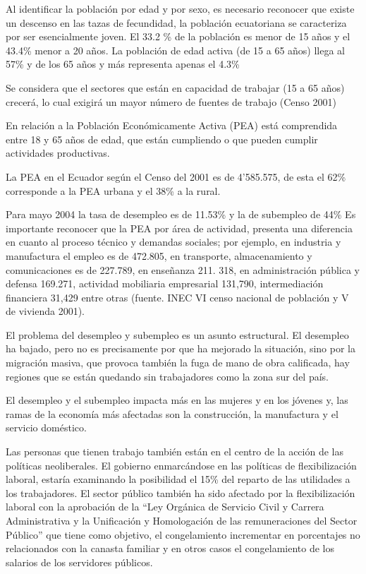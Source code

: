 Al identificar la población por edad y por sexo, es necesario reconocer que existe un descenso en las tazas de fecundidad, la población  ecuatoriana se caracteriza por ser esencialmente joven. El 33.2 \% de la población es menor de 15 años y el 43.4\% menor a 20 años. La población de edad activa (de 15 a 65 años)  llega al 57\% y de los 65 años y más representa apenas el 4.3\%

Se considera que el sectores que están en capacidad de trabajar (15 a 65 años) crecerá, lo cual exigirá un mayor número de fuentes de trabajo (Censo 2001)

En relación a la Población Económicamente Activa (PEA) está comprendida  entre 18 y 65 años de edad, que están cumpliendo o que pueden cumplir actividades productivas.

La PEA en el Ecuador según el Censo del 2001 es de 4'585.575, de esta el 62\% corresponde a la PEA urbana y el 38\% a la rural.

Para mayo 2004 la tasa de desempleo es de 11.53\% y la de subempleo de 44\% Es importante reconocer que  la PEA por área de actividad, presenta una diferencia en cuanto al proceso técnico y demandas sociales; por ejemplo, en industria y manufactura el empleo es de 472.805, en transporte, almacenamiento y comunicaciones es de 227.789, en enseñanza 211. 318, en administración pública y defensa 169.271, actividad mobiliaria empresarial 131,790, intermediación financiera 31,429 entre otras (fuente. INEC VI censo nacional de población  y V de vivienda 2001).

El problema del desempleo y subempleo es un asunto estructural. El desempleo ha bajado, pero no es precisamente por que ha mejorado la situación, sino por la migración masiva, que provoca también la fuga de mano de obra calificada, hay regiones que se están quedando sin trabajadores  como la zona sur del país.

El desempleo y el subempleo impacta más en las mujeres y en los jóvenes y, las ramas de la economía más afectadas son la construcción, la manufactura y el servicio doméstico. 

Las personas que tienen trabajo también están en el centro de la acción de las políticas neoliberales. El gobierno enmarcándose en las políticas de flexibilización laboral,  estaría examinando la posibilidad el 15\% del reparto de las utilidades a los trabajadores. El sector público también ha sido afectado por la flexibilización laboral con la aprobación de la ``Ley Orgánica de Servicio Civil y Carrera Administrativa y la Unificación y Homologación de las remuneraciones del Sector Público'' que tiene como objetivo, el congelamiento incrementar en porcentajes no relacionados con la canasta familiar y en otros casos el congelamiento de los salarios de los servidores públicos.

